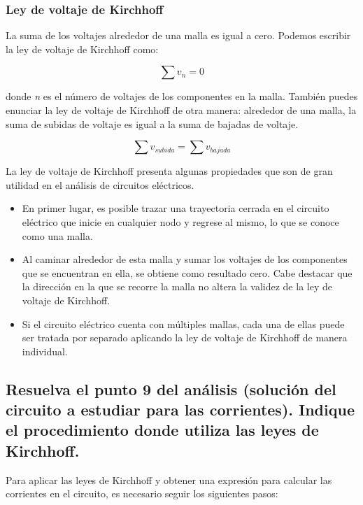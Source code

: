 \documentclass[twocolumn, 12pt]{article}
\begin{document}
\subsubsection*{Ley de voltaje de Kirchhoff}

La suma de los voltajes alrededor de una malla es igual a
cero. Podemos escribir la ley de voltaje de Kirchhoff como:

{\Large
\begin{equation}
	\sum v_n = 0
\end{equation}
}

donde \textit{n} es el número de voltajes de los
componentes en la malla. También puedes enunciar la ley de
voltaje de Kirchhoff de otra manera: alrededor de una
malla, la suma de subidas de voltaje es igual a la suma de
bajadas de voltaje.

	{\Large
		\begin{equation}
			\sum v_{subida} = \sum v_{bajada}
		\end{equation}
	}

La ley de voltaje de Kirchhoff presenta algunas propiedades
que son de gran utilidad en el análisis de circuitos
eléctricos.

\begin{itemize}
	\item En primer lugar, es posible trazar una trayectoria cerrada
	      en el circuito eléctrico que inicie en cualquier nodo y
	      regrese al mismo, lo que se conoce como una malla.
	\item Al caminar alrededor de esta malla y sumar los voltajes de
	      los componentes que se encuentran en ella, se obtiene como
	      resultado cero. Cabe destacar que la dirección en la que se
	      recorre la malla no altera la validez de la ley de voltaje
	      de Kirchhoff.
	\item Si el circuito eléctrico cuenta con múltiples mallas, cada
	      una de ellas puede ser tratada por separado aplicando la
	      ley de voltaje de Kirchhoff de manera individual.
\end{itemize}

\subsection*{Resuelva el punto 9 del análisis (solución del circuito a estudiar para las corrientes).
	Indique el procedimiento donde utiliza las leyes de Kirchhoff.}

Para aplicar las leyes de Kirchhoff y obtener una expresión
para calcular las corrientes en el circuito, es necesario
seguir los siguientes pasos:
\end{document}

